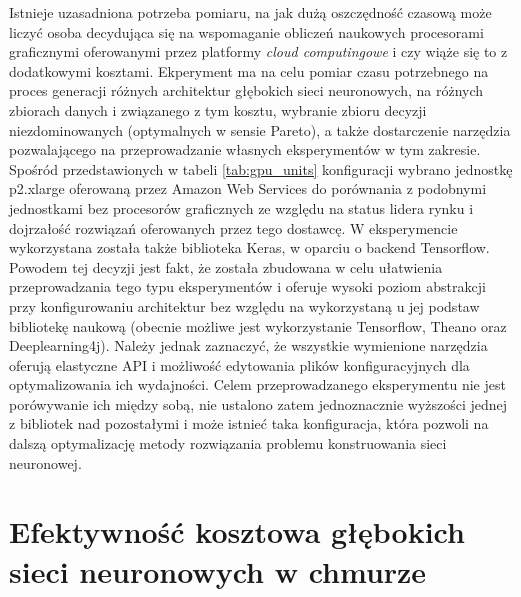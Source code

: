 \documentclass[12pt,a4paper,twoside]{article}
\begin{document}
Istnieje uzasadniona potrzeba pomiaru, na jak dużą oszczędność czasową może liczyć osoba decydująca się na wspomaganie obliczeń naukowych procesorami graficznymi oferowanymi przez platformy \textit{cloud computingowe} i czy wiąże się to z dodatkowymi kosztami. Ekperyment ma na celu pomiar czasu potrzebnego na proces generacji różnych architektur głębokich sieci neuronowych, na różnych zbiorach danych i związanego z tym kosztu, wybranie zbioru decyzji niezdominowanych (optymalnych w sensie Pareto), a także dostarczenie narzędzia pozwalającego na przeprowadzanie własnych eksperymentów w tym zakresie.
Spośród przedstawionych w tabeli \ref{tab:gpu_units} konfiguracji wybrano jednostkę p2.xlarge oferowaną przez Amazon Web Services do porównania z podobnymi jednostkami bez procesorów graficznych ze względu na status lidera rynku i dojrzałość rozwiązań oferowanych przez tego dostawcę.
W eksperymencie wykorzystana została także biblioteka Keras, w oparciu o backend Tensorflow. Powodem tej decyzji jest fakt, że została zbudowana w celu ułatwienia przeprowadzania tego typu eksperymentów i oferuje wysoki poziom abstrakcji przy konfigurowaniu architektur bez względu na wykorzystaną u jej podstaw bibliotekę naukową (obecnie możliwe jest wykorzystanie Tensorflow, Theano oraz Deeplearning4j). Należy jednak zaznaczyć, że wszystkie wymienione narzędzia oferują elastyczne API i możliwość edytowania plików konfiguracyjnych dla optymalizowania ich wydajności. Celem przeprowadzanego eksperymentu nie jest porówywanie ich między sobą, nie ustalono zatem jednoznacznie wyższości jednej z bibliotek nad pozostałymi i może istnieć taka konfiguracja, która pozwoli na dalszą optymalizację metody rozwiązania problemu konstruowania sieci neuronowej.





%

\clearpage

\section{Efektywność kosztowa głębokich sieci neuronowych w chmurze}
\end{document}
